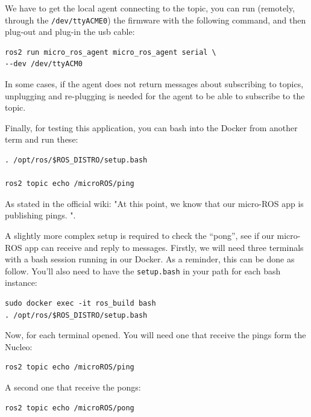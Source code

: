 \documentclass[10pt]{article}
\begin{document}
We have to get the local agent connecting to the topic, you can run (remotely, through the \verb|/dev/ttyACME0|) the firmware with the following command, and then plug-out and plug-in the usb cable:
\begin{tcolorbox}
\begin{verbatim}
ros2 run micro_ros_agent micro_ros_agent serial \
--dev /dev/ttyACM0
\end{verbatim}
\end{tcolorbox}
In some cases, if the agent does not return messages about subscribing to topics, unplugging and re-plugging is needed for the agent to be able to subscribe to the topic.

Finally, for testing this application, you can bash into the Docker from another term and run these:
\begin{tcolorbox}
\begin{verbatim}
. /opt/ros/$ROS_DISTRO/setup.bash

ros2 topic echo /microROS/ping
\end{verbatim}
\end{tcolorbox}
As stated in the official wiki: "At this point, we know that our micro-ROS app is publishing pings. ".

A slightly more complex setup is required to check the ``pong'', see if our micro-ROS app can receive and reply to messages.
Firstly, we will need three terminals with a bash session running in our Docker. As a reminder, this can be done as follow. You'll also need to have the \verb|setup.bash| in your path for each bash instance:
\begin{tcolorbox}
\begin{verbatim}
sudo docker exec -it ros_build bash
. /opt/ros/$ROS_DISTRO/setup.bash
\end{verbatim}
\end{tcolorbox}

Now, for each terminal opened.
You will need one that receive the pings form the Nucleo:
\begin{tcolorbox}
\begin{verbatim}
ros2 topic echo /microROS/ping
\end{verbatim}
\end{tcolorbox}

A second one that receive the pongs:
\begin{tcolorbox}
\begin{verbatim}
ros2 topic echo /microROS/pong
\end{verbatim}
\end{tcolorbox}
\end{document}
